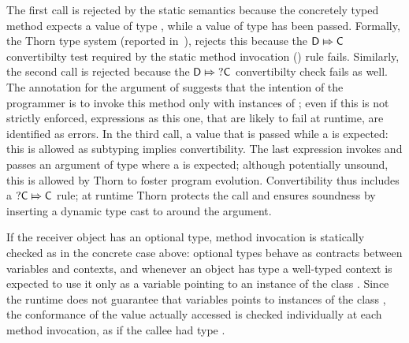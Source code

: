 \documentclass[acmlarge, anonymous, authordraft, review]{acmart} %
\begin{document}
\noindent The first call is rejected by the static semantics because the concretely typed method \n expects a value of type \C, while a value of type \D has been passed.  Formally, the Thorn type system (reported in~), rejects this because the \(\D\Mapsto\C\) convertibilty test required by the static method invocation () rule fails.  Similarly, the second call is rejected because the \(\D\Mapsto\dt\C\) convertibilty check fails as well.  The \dt\C annotation for the argument of \m suggests that the intention of the programmer is to invoke this  method only with instances of \C; even if this is not strictly enforced, expressions as this one, that are likely to fail at runtime, are identified as errors.
In the third call, a \C value that is passed while a \dt\C is expected: this is allowed as subtyping implies convertibility.  The last expression invokes \n and passes an argument of type \dt\C where a \C is expected; although potentially unsound, this is allowed by Thorn to foster program evolution.  Convertibility thus includes a \(\dt\C\Mapsto\C\) rule; at runtime Thorn protects the call and ensures soundness by inserting a dynamic type cast to \C around the argument.

If the receiver object has an optional type,  method invocation is statically checked as in the concrete case above:
 optional types behave as contracts between variables and contexts, and whenever an object has type \dt\C a well-typed context is expected to use it only as a variable pointing to an instance of the class \C.  Since the runtime does not guarantee that  \dt\C variables points to instances of the class \C, the conformance of the value actually accessed is checked individually at each method invocation, as if the callee had type \any.  
 
\end{document}
